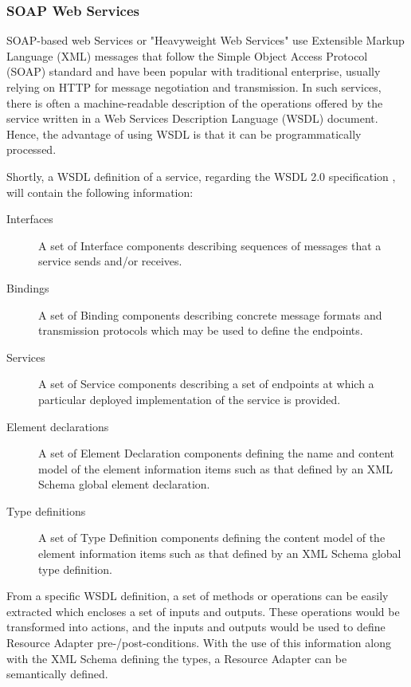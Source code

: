 \documentclass{fast_latex}
\begin{document}

\subsubsection{SOAP Web Services} %
\label{ssub:soap_web_services}

SOAP-based web Services or "Heavyweight Web Services" use Extensible Markup Language (XML) \cite{XML1.1} messages that follow the Simple Object Access Protocol (SOAP) standard \cite{SOAP1.2} and have been popular with traditional enterprise, usually relying on HTTP for message negotiation and transmission. In such services, there is often a machine-readable description of the operations offered by the service written in a Web Services Description Language (WSDL) document. Hence, the advantage of using WSDL is that it can be programmatically processed. 

Shortly, a WSDL definition of a service, regarding the WSDL 2.0 specification \cite{WSDL2.0}, will contain the following information:
\begin{description}
	\item[Interfaces] A set of Interface components describing sequences of messages that a service sends and/or receives.
	\item[Bindings] A set of Binding components describing concrete message formats and transmission protocols which may be used to define the endpoints.
	\item[Services] A set of Service components describing a set of endpoints at which a particular deployed implementation of the service is provided.
	\item[Element declarations] A set of Element Declaration components defining the name and content model of the element information items such as that defined by an XML Schema global element declaration.
	\item[Type definitions] A set of Type Definition components defining the content model of the element information items such as that defined by an XML Schema global type definition.
\end{description}

From a specific WSDL definition, a set of methods or operations can be easily extracted which encloses a set of inputs and outputs. These operations would be transformed into actions, and the inputs and outputs would be used to define Resource Adapter pre-/post-conditions. With the use of this information along with the XML Schema defining the types, a Resource Adapter can be semantically defined.
\end{document}
